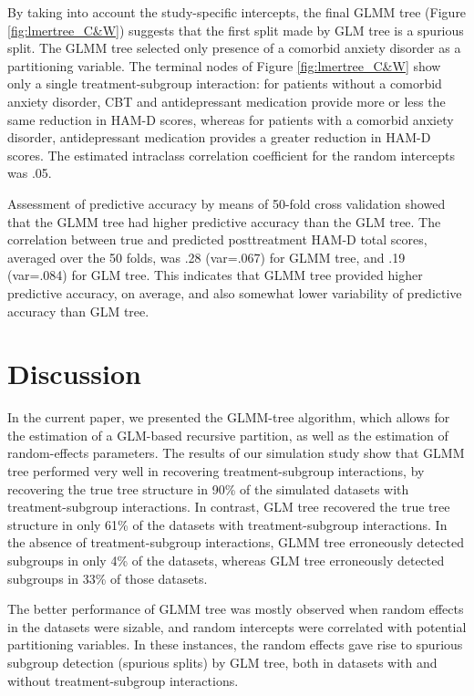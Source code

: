 \documentclass[nobf,doc]{apa}
\begin{document}
By taking into account the study-specific intercepts, the final GLMM tree (Figure \ref{fig:lmertree_C&W}) suggests that the first split made by GLM tree is a spurious split. The GLMM tree selected only presence of a comorbid anxiety disorder as a partitioning variable. The terminal nodes of Figure \ref{fig:lmertree_C&W} show only a single treatment-subgroup interaction: for patients without a comorbid anxiety disorder, CBT and antidepressant medication provide more or less the same reduction in HAM-D scores, whereas for patients with a comorbid anxiety disorder, antidepressant medication provides a greater reduction in HAM-D scores. The estimated intraclass correlation coefficient for the random intercepts was .05. 

Assessment of predictive accuracy by means of 50-fold cross validation showed that the GLMM tree had higher predictive accuracy than the GLM tree. The correlation between true and predicted posttreatment HAM-D total scores, averaged over the 50 folds, was .28 (var=.067) for GLMM tree, and .19 (var=.084) for GLM tree. This indicates that GLMM tree provided higher predictive accuracy, on average, and also somewhat lower variability of predictive accuracy than GLM tree. 



\section{Discussion}

In the current paper, we presented the GLMM-tree algorithm, which allows for the estimation of a GLM-based recursive partition, as well as the estimation of random-effects parameters. The results of our simulation study show that GLMM tree performed very well in recovering treatment-subgroup interactions, by recovering the true tree structure in 90\% of the simulated datasets with treatment-subgroup interactions. In contrast, GLM tree recovered the true tree structure in only 61\% of the datasets with treatment-subgroup interactions. In the absence of treatment-subgroup interactions, GLMM tree erroneously detected subgroups in only 4\% of the datasets, whereas GLM tree erroneously detected subgroups in 33\% of those datasets. 

The better performance of GLMM tree was mostly observed when random effects in the datasets were sizable, and random intercepts were correlated with potential partitioning variables. In these instances, the random effects gave rise to spurious subgroup detection (spurious splits) by GLM tree, both in datasets with and without treatment-subgroup interactions. 
\end{document}
